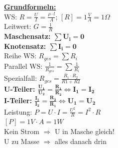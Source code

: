 \documentclass[8pt]{extarticle}
\begin{document}
\begin{minipage}{0.33\textwidth}

\underline{\textbf{Grundformeln:}}\\
WS: $R = \frac{U}{I} = \frac{\rho \cdot l}{A}$; $[R] = 1\frac{V}{A} =1 \Omega$\\
Leitwert: $G = \frac{1}{R}$\\
\textbf{Maschensatz: $\mathbf{\sum U_i = 0}$\\}
\textbf{Knotensatz: $\mathbf{\sum I_i = 0}$\\}
Reihe WS: $R_{ges} = \sum R_i$\\
Parallel WS: $\frac{1}{R_{ges}} = \sum \frac{1}{R_i}$\\
\phantom{ss} Spezialfall: $R_{ges} = \frac{R_1 \cdot R_2}{R1+R2} $\\
\textbf{U-Teiler: $\mathbf{\frac{U_1}{U_2} = \frac{R_1}{R_2}\Leftrightarrow I_1 = I_2}$\\}
\textbf{I-Teiler: $\mathbf{\frac{I_1}{I_2} = \frac{R_2}{R_1}\Leftrightarrow U_1 = U_2}$\\}
Leistung: $P =U \cdot I = \frac{U^2}{R} = I^2 \cdot R $ \\
\phantom{ssssssssss} $[P] = 1V \cdot A =1 W$\\
Kein Strom $\Rightarrow$ U in Masche gleich!\\
U zu Masse $\Rightarrow$ alles danach drin


\end{minipage}
\end{document}
